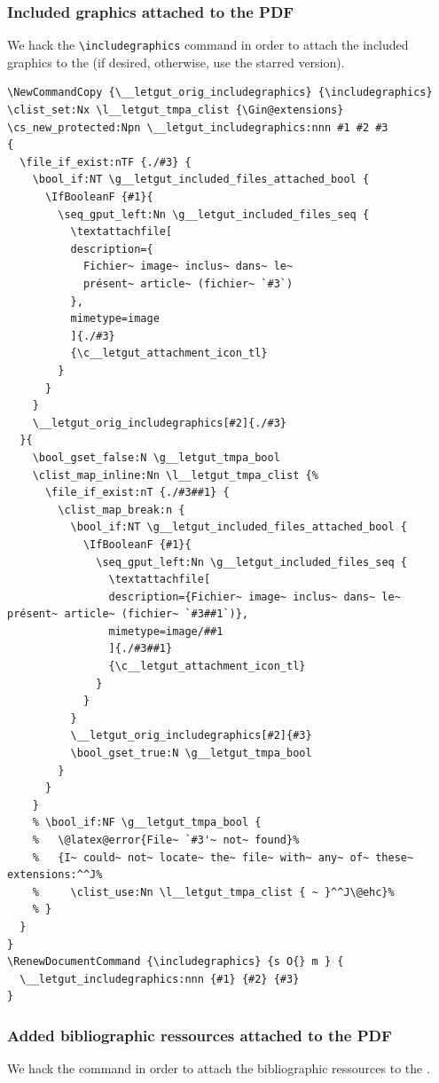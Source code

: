 \documentclass{letgut}
\begin{document}
\subsubsection{Included graphics attached to the PDF}
\label{ImplementationMiscellanousIncludedgraphicsattachedtothePDF-xoc34ja00pj0}
We hack the \lstinline+\includegraphics+ command in order to attach the included graphics
to the \pdf{} (if desired, otherwise, use the starred version).

\begin{lstlisting}
\NewCommandCopy {\__letgut_orig_includegraphics} {\includegraphics}
\clist_set:Nx \l__letgut_tmpa_clist {\Gin@extensions}
\cs_new_protected:Npn \__letgut_includegraphics:nnn #1 #2 #3
{
  \file_if_exist:nTF {./#3} {
    \bool_if:NT \g__letgut_included_files_attached_bool {
      \IfBooleanF {#1}{
        \seq_gput_left:Nn \g__letgut_included_files_seq {
          \textattachfile[
          description={
            Fichier~ image~ inclus~ dans~ le~
            présent~ article~ (fichier~ `#3`)
          },
          mimetype=image
          ]{./#3}
          {\c__letgut_attachment_icon_tl}
        }
      }
    }
    \__letgut_orig_includegraphics[#2]{./#3}
  }{
    \bool_gset_false:N \g__letgut_tmpa_bool
    \clist_map_inline:Nn \l__letgut_tmpa_clist {%
      \file_if_exist:nT {./#3##1} {
        \clist_map_break:n {
          \bool_if:NT \g__letgut_included_files_attached_bool {
            \IfBooleanF {#1}{
              \seq_gput_left:Nn \g__letgut_included_files_seq {
                \textattachfile[
                description={Fichier~ image~ inclus~ dans~ le~ présent~ article~ (fichier~ `#3##1`)},
                mimetype=image/##1
                ]{./#3##1}
                {\c__letgut_attachment_icon_tl}
              }
            }
          }
          \__letgut_orig_includegraphics[#2]{#3}
          \bool_gset_true:N \g__letgut_tmpa_bool
        }
      }
    }
    % \bool_if:NF \g__letgut_tmpa_bool {
    %   \@latex@error{File~ `#3'~ not~ found}%
    %   {I~ could~ not~ locate~ the~ file~ with~ any~ of~ these~ extensions:^^J%
    %     \clist_use:Nn \l__letgut_tmpa_clist { ~ }^^J\@ehc}%
    % }
  }
}
\RenewDocumentCommand {\includegraphics} {s O{} m } {
  \__letgut_includegraphics:nnn {#1} {#2} {#3}
}
\end{lstlisting}
\subsubsection{Added bibliographic ressources attached to the PDF}
\label{ImplementationMiscellanousAddedbibliographicressourcesattachedtothePDF-l4e34ja00pj0}
We hack the \lstinline++ command in order to attach the bibliographic
ressources to the \pdf{}.
\end{document}
